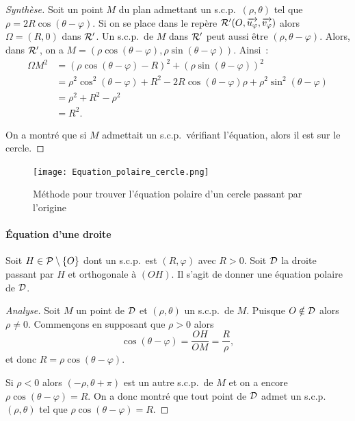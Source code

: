 \begin{proof}[Synthèse]
    Soit un point \(M\) du plan admettant un s.c.p.\ \((\rho , \theta)\) tel que 
    \(\rho = 2R\cos(\theta - \varphi)\). Si on se place dans le repère \(\Rep' 
    (O , \vect{u_\varphi}, \vect{v_\varphi})\) alors \(\Omega =(R , 0)\) dans 
    \(\Rep'\). Un s.c.p.\ de \(M\) dans \(\Rep'\) peut aussi être 
    \((\rho , \theta - \varphi)\). Alors, dans \(\Rep'\), on a \(M = (\rho 
    \cos(\theta - \varphi), \rho \sin(\theta - \varphi))\). Ainsi~:
    \begin{align}
        {\Omega M}^2& = (\rho\cos(\theta - \varphi)-R)^2 + 
        (\rho\sin(\theta - \varphi))^2 \\
                    &= \rho^2 \cos^2(\theta - \varphi) + R^2 - 
                    2R\cos(\theta - \varphi)\rho + \rho^2 \sin^2(\theta - \varphi) 
                    \\
                    &= \rho^2 + R^2 - \rho^2\\
                    &= R^2.
    \end{align}

    On a montré que si \(M\) admettait un s.c.p.\ vérifiant l'équation, alors il 
    est sur le cercle.
\end{proof}

\begin{figure}
    \centering
    \texttt{[image: Equation\_polaire\_cercle.png]}
    \caption{Méthode pour trouver l'équation polaire d'un cercle passant par 
    l'origine}
    \label{fig:cerclepolaire}
\end{figure}

\paragraph{Équation d'une droite}
\label{par:eqdroite}

Soit \(H \in \P\setminus\{O\}\) dont un s.c.p.\ est \((R , \varphi)\) avec 
\(R>0\). Soit \(\Dr\) la droite passant par \(H\) et orthogonale à \((OH)\). Il 
s'agit de donner une équation polaire de \(\Dr\).

\begin{proof}[Analyse]
    Soit \(M\) un point de \(\Dr\) et \((\rho , \theta)\) un s.c.p.\ de \(M\).  
    Puisque \(O \notin \Dr\) alors \(\rho \neq 0\). Commençons en supposant que 
    \(\rho>0\) alors
    \begin{equation}
        \cos(\theta - \varphi) = \frac{OH}{OM} = \frac{R}{\rho},
    \end{equation}
    et donc \(R = \rho \cos(\theta - \varphi)\). 

    Si \(\rho<0\) alors \((-\rho , \theta + \pi)\) est un autre s.c.p.\ de \(M\) 
    et on a encore \(\rho\cos(\theta - \varphi) = R\). On a donc montré que tout 
    point de \(\Dr\) admet un s.c.p.\ \((\rho, \theta)\) tel que 
    \(\rho\cos(\theta - \varphi) = R\).
\end{proof}


